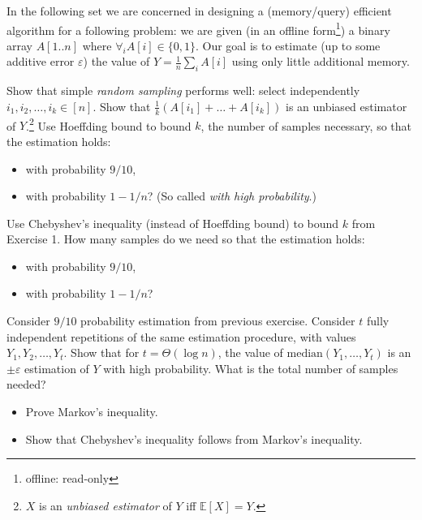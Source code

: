 \documentclass[12pt]{uebung}
\begin{document}
 


\renewcommand{\aufgname}{Exercise}





In the following set we are concerned in designing a (memory/query) efficient algorithm for a following problem: we are given (in an offline form\footnote{offline: read-only}) a binary array $A[1 .. n]$ where $\forall_i A[i] \in \{0,1\}$. Our goal is to estimate (up to some additive error $\varepsilon$) the value of $Y = \frac{1}{n}\sum_i A[i]$ using only little additional memory.

\begin{aufg}[2 pts]
Show that simple \emph{random sampling} performs well: select independently $i_1,i_2,\ldots,i_k \in [n]$. Show that $\frac{1}{k}(A[i_1]+\ldots+A[i_k])$ is an unbiased estimator of $Y$.\footnote{$X$ is an \emph{unbiased estimator} of $Y$ iff $\mathbb{E}[X] = Y$.} Use Hoeffding bound to bound $k$, the number of samples necessary, so that the estimation holds:
\begin{itemize}
\item with probability $9/10$,
\item with probability $1-1/n$? (So called \emph{with high probability}.)
\end{itemize}
\end{aufg}

\begin{aufg}[2 pts]
Use Chebyshev's inequality (instead of Hoeffding bound) to bound $k$ from Exercise 1. How many samples do we need so that the estimation holds:
\begin{itemize}
\item with probability $9/10$,
\item with probability $1-1/n$?
\end{itemize}
\end{aufg}

\begin{aufg}[2 pts]
Consider $9/10$ probability estimation from previous exercise. Consider $t$ fully independent repetitions of the same estimation procedure, with values $Y_1,Y_2,\ldots,Y_t$. Show that for $t=\Theta(\log n)$, the value of $\textrm{median}(Y_1,\ldots,Y_t)$ is an $\pm \varepsilon$ estimation of $Y$ with high probability.
What is the total number of samples needed?
\end{aufg}

\begin{aufg}[2 pts]
\begin{itemize}
\item Prove Markov's inequality. 
\item Show that Chebyshev's inequality follows from Markov's inequality.
\end{itemize}
\end{aufg}
\end{document}
